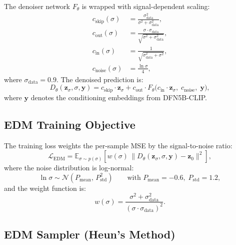 \documentclass[12pt,a4paper]{article}
\newcommand{\E}{\mathbb{E}}
\newcommand{\N}{\mathcal{N}}
\newcommand{\loss}{\mathcal{L}}
\newcommand{\zvec}{\bm{z}}
\theoremstyle{definition}
\begin{document}
The denoiser network $F_\theta$ is wrapped with signal-dependent scaling:
\begin{align}
  c_{\mathrm{skip}}(\sigma) &= \frac{\sigma_{\mathrm{data}}^2}{\sigma^2 + \sigma_{\mathrm{data}}^2}, \label{eq:cskip}\\
  c_{\mathrm{out}}(\sigma) &= \frac{\sigma \cdot \sigma_{\mathrm{data}}}{\sqrt{\sigma^2 + \sigma_{\mathrm{data}}^2}}, \label{eq:cout}\\
  c_{\mathrm{in}}(\sigma) &= \frac{1}{\sqrt{\sigma_{\mathrm{data}}^2 + \sigma^2}}, \label{eq:cin}\\
  c_{\mathrm{noise}}(\sigma) &= \frac{\ln \sigma}{4}, \label{eq:cnoise}
\end{align}
where $\sigma_{\mathrm{data}} = 0.9$.  The denoised prediction is:
\begin{equation}
  D_\theta(\zvec_\sigma, \sigma, \bm{y}) =
    c_{\mathrm{skip}} \cdot \zvec_\sigma
    + c_{\mathrm{out}} \cdot F_\theta\!\bigl(c_{\mathrm{in}} \cdot \zvec_\sigma,\; c_{\mathrm{noise}},\; \bm{y}\bigr),
  \label{eq:denoiser}
\end{equation}
where $\bm{y}$ denotes the conditioning embeddings from DFN5B-CLIP.

\subsection{EDM Training Objective}

The training loss weights the per-sample MSE by the signal-to-noise ratio:
\begin{equation}
  \loss_{\mathrm{EDM}} = \E_{\sigma \sim p(\sigma)}\!\left[
    w(\sigma)\, \bigl\| D_\theta(\zvec_\sigma, \sigma, \bm{y}) - \zvec_0 \bigr\|^2
  \right],
  \label{eq:edm_loss}
\end{equation}
where the noise distribution is log-normal:
\begin{equation}
  \ln \sigma \sim \N(P_{\mathrm{mean}},\, P_{\mathrm{std}}^2)
  \qquad \text{with } P_{\mathrm{mean}} = -0.6,\; P_{\mathrm{std}} = 1.2,
\end{equation}
and the weight function is:
\begin{equation}
  w(\sigma) = \frac{\sigma^2 + \sigma_{\mathrm{data}}^2}{(\sigma \cdot \sigma_{\mathrm{data}})^2}.
  \label{eq:edm_weight}
\end{equation}

\subsection{EDM Sampler (Heun's Method)}
\end{document}

